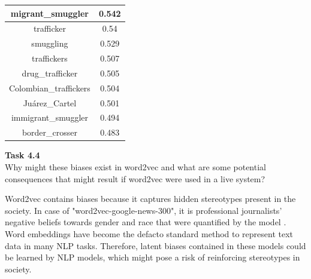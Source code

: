 \documentclass[12pt,article]{article}
\newenvironment{task}[2][Task]
    { \begin{mdframed}[backgroundcolor=gray!20] \textbf{#1 #2} \\}
    {  \end{mdframed}}
\begin{document}
\begin{table}[H]
\begin{minipage}[c]{0.25\linewidth}
{\begin{tabular}{|c|c|}
        \hline
        migrant\_smuggler &  0.542 \\ 
        \hline
        trafficker &  0.54 \\ 
        \hline
        smuggling &  0.529 \\ 
        \hline
        traffickers &  0.507 \\ 
        \hline
        drug\_trafficker &  0.505 \\ 
        \hline
        Colombian\_traffickers &  0.504 \\ 
        \hline
        Juárez\_Cartel &  0.501 \\ 
        \hline
        immigrant\_smuggler &  0.494 \\ 
        \hline
        border\_crosser &  0.483 \\
        \hline
\end{tabular}}
\end{minipage}
\end{table}
\begin{task}{4.4} 
Why might these biases exist in word2vec and what are some potential consequences that might result if word2vec were used in a live system?
\end{task}

Word2vec contains biases because it captures hidden stereotypes present in the society. In case of "word2vec-google-news-300", it is professional journalists' negative beliefs towards gender and race that were quantified by the model \cite{DebiasingWordEmbeddings}. Word embeddings have become the defacto standard method to represent text data in many NLP tasks. Therefore, latent biases contained in these models could be learned by NLP models, which might pose a risk of reinforcing stereotypes in society.



\end{document}
